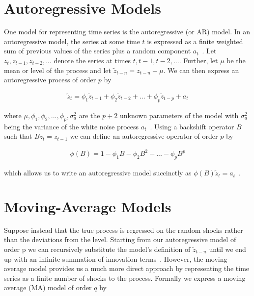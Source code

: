 \documentclass[oneside,12pt,openany]{book}
\begin{document}

	\section{Autoregressive Models}

	 One model for representing time series is the autoregressive (or AR) model. In an autoregressive model, the series at some time $t$ is expressed as a finite weighted sum of previous values of the series plus a random component $a_{t}$~\cite{Box}. Let $z_{t}, z_{t-1}, z_{t-2},...$ denote the series at times $t, t-1, t-2,...$. Further, let $\mu$ be the mean or level of the process and let $\tilde{z}_{t-n}=z_{t-n}-\mu$. We can then express an autoregressive process of order $p$ by
	
	\begin{align}
		\label{eqn:armodel}
		\tilde{z}_{t}=\phi_{1} \tilde{z}_{t-1}+\phi_{2} \tilde{z}_{t-2}+...+\phi_{p} \tilde{z}_{t-p}+a_{t}
	\end{align}
	
	\noindent where $\mu, \phi_{1}, \phi_{2}, ..., \phi_{p}, \sigma^{2}_{a}$ are the $p+2$ unknown parameters of the model with $\sigma^{2}_{a}$ being the variance of the white noise process $a_{t}$~\cite{Box}. Using a backshift operator $B$ such that $Bz_{t}=z_{t-1}$ we can define an autoregressive operator of order $p$ by
	
	\begin{align}
		\label{eqn:arop}
		\phi(B)=1-\phi_{1}B-\phi_{2}B^{2}-...-\phi_{p}B^{p}
	\end{align}
	
	\noindent which allows us to write an autoregressive model succinctly as $\phi(B)\tilde{z}_{t}=a_{t}$~\cite{Box}.

	\section{Moving-Average Models}
	
	Suppose instead that the true process is regressed on the random shocks rather than the deviations from the level. Starting from our autoregressive model  of order p we can recursively substitute the model's definition of $\tilde{z}_{t-n}$ until we end up with an infinite summation of innovation terms~\cite{Box}. However, the moving average model provides us a much more direct approach by representing the time series as a finite number of shocks to the process. Formally we express a moving average (MA) model of order $q$ by
	
\end{document}
